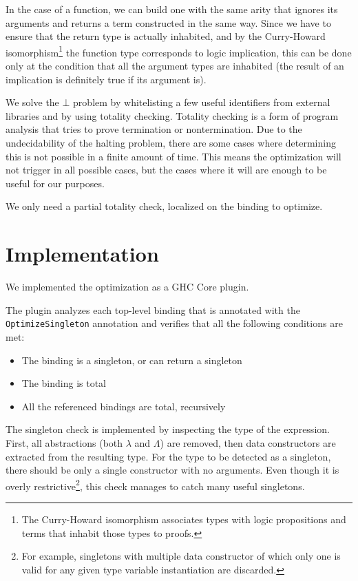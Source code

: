 In the case of a function, we can build one with the same arity that ignores its arguments and returns a term constructed in the same way.
Since we have to ensure that the return type is actually inhabited, and by the Curry-Howard isomorphism\footnote{The Curry-Howard isomorphism associates types with logic propositions and terms that inhabit those types to proofs.} the function type corresponds to logic implication, this can be done only at the condition that all the argument types are inhabited (the result of an implication is definitely true if its argument is).

We solve the $\bot$ problem by whitelisting a few useful identifiers from external libraries and by using totality checking.
Totality checking is a form of program analysis that tries to prove termination or nontermination.
Due to the undecidability of the halting problem, there are some cases where determining this is not possible in a finite amount of time.
This means the optimization will not trigger in all possible cases, but the cases where it will are enough to be useful for our purposes.

We only need a partial totality check, localized on the binding to optimize.

\section{Implementation}
\label{sec:implementation}

We implemented the optimization as a GHC Core plugin.

The plugin analyzes each top-level binding that is annotated with the \texttt{OptimizeSingleton} annotation and verifies that all the following conditions are met:

\begin{itemize}
  \item{The binding is a singleton, or can return a singleton}
  \item{The binding is total}
  \item{All the referenced bindings are total, recursively}
\end{itemize}

The singleton check is implemented by inspecting the type of the expression.
First, all abstractions (both $\lambda$ and $\Lambda$) are removed, then data constructors are extracted from the resulting type. %
For the type to be detected as a singleton, there should be only a single constructor with no arguments.
Even though it is overly restrictive\footnote{For example, singletons with multiple data constructor of which only one is valid for any given type variable instantiation are discarded.}, this check manages to catch many useful singletons.

